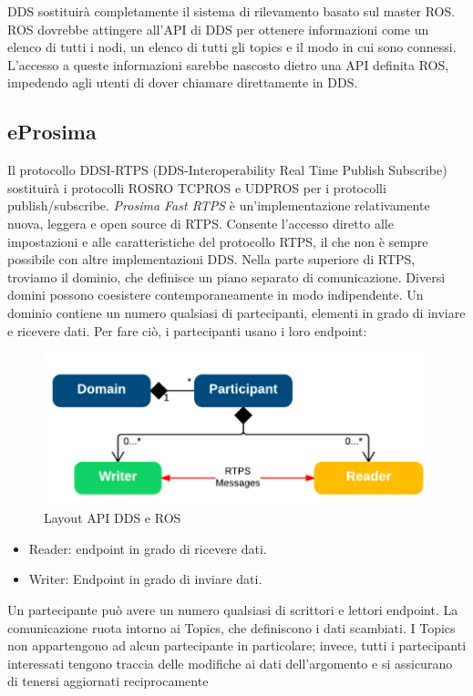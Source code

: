 \documentclass[a4paper]{article}
\begin{document}
DDS sostituirà completamente il sistema di rilevamento basato sul master ROS. ROS dovrebbe attingere all'API di DDS per ottenere informazioni come un elenco di tutti i nodi, un elenco di tutti gli topics e il modo in cui sono connessi. L'accesso a queste informazioni sarebbe nascosto dietro una API definita ROS, impedendo agli utenti di dover chiamare direttamente in DDS.

\subsection{eProsima}
Il protocollo DDSI-RTPS (DDS-Interoperability Real Time Publish Subscribe) sostituirà i protocolli ROSRO TCPROS e UDPROS per i protocolli publish/subscribe.
\textit{Prosima Fast RTPS} è un'implementazione relativamente nuova, leggera e open source di RTPS. Consente l'accesso diretto alle impostazioni e alle caratteristiche del protocollo RTPS, il che non è sempre possibile con altre implementazioni DDS. 
Nella parte superiore di RTPS, troviamo il dominio, che definisce un piano separato di comunicazione. Diversi domini possono coesistere contemporaneamente in modo indipendente. Un dominio contiene un numero qualsiasi di partecipanti, elementi in grado di inviare e ricevere dati. Per fare ciò, i partecipanti usano i loro endpoint:

\begin{figure}[htbp]
\centering
\includegraphics[scale=0.5]{dds_img1.PNG} 
\caption{Layout API DDS e ROS}
\end{figure}

\begin{itemize}
\item Reader: endpoint in grado di ricevere dati.

\item Writer: Endpoint in grado di inviare dati.
\end{itemize}

Un partecipante può avere un numero qualsiasi di scrittori e lettori endpoint.
La comunicazione ruota intorno ai Topics, che definiscono i dati scambiati. I Topics non appartengono ad alcun partecipante in particolare; invece, tutti i partecipanti interessati tengono traccia delle modifiche ai dati dell'argomento e si assicurano di tenersi aggiornati reciprocamente
\end{document}
